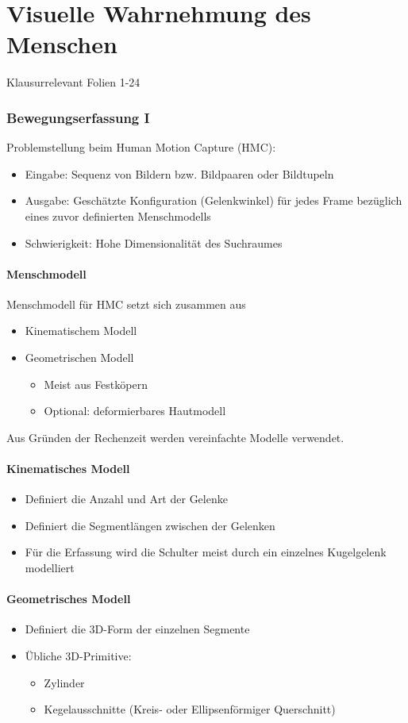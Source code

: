 
\chapter{Visuelle Wahrnehmung des Menschen}
Klausurrelevant Folien 1-24
\subsection{Bewegungserfassung I}
Problemstellung beim Human Motion Capture (HMC):
\begin{itemize}
	\item Eingabe: Sequenz von Bildern bzw. Bildpaaren oder Bildtupeln
	\item Ausgabe: Geschätzte Konfiguration (Gelenkwinkel) für jedes Frame bezüglich eines zuvor definierten Menschmodells
	\item Schwierigkeit: Hohe Dimensionalität des Suchraumes
\end{itemize}
\subsubsection{Menschmodell}
Menschmodell für HMC setzt sich zusammen aus
\begin{itemize}
	\item Kinematischem Modell
	\item Geometrischen Modell
	\begin{itemize}
		\item Meist aus Festköpern
		\item Optional: deformierbares Hautmodell
	\end{itemize}
\end{itemize}
Aus Gründen der Rechenzeit werden vereinfachte Modelle verwendet.
\subsubsection{Kinematisches Modell}
\begin{itemize}
	\item Definiert die Anzahl und Art der Gelenke
	\item Definiert die Segmentlängen zwischen der Gelenken
	\item Für die Erfassung wird die Schulter meist durch ein einzelnes Kugelgelenk modelliert
	\end{itemize}
\subsubsection{Geometrisches Modell}
\begin{itemize}
	\item Definiert die 3D-Form der einzelnen Segmente
	\item Übliche 3D-Primitive:
	
	\begin{itemize}
		\item Zylinder
		\item Kegelausschnitte (Kreis- oder Ellipsenförmiger Querschnitt)
	\end{itemize}
\end{itemize}
